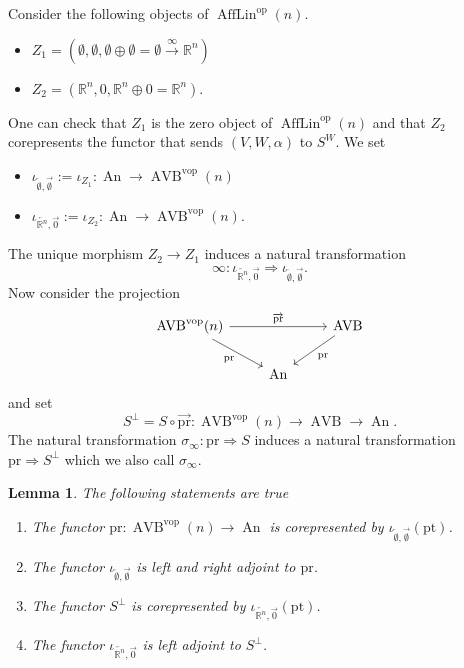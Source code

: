 \documentclass{article}
\newcommand{\xto}{\xrightarrow}
\newcommand{\R}{\mathbb{R}} %
\newcommand{\pt}{\mathrm{pt}}
\newcommand{\op}{\mathrm{op}}
\newcommand{\vop}{\mathrm{vop}}
\newcommand{\pr}{\mathrm{pr}}
\newcommand{\iotaemptyempty}{\iota_{\overleftarrow{\emptyset},\overrightarrow{\emptyset}}}
\newcommand{\iotarnzero}{\iota_{\overleftarrow{\R^n},\overrightarrow{0}}}
\DeclareMathOperator{\AVB}{AVB}
\DeclareMathOperator{\An}{An}
\DeclareMathOperator{\AffLin}{AffLin}
\newtheorem{lemma}{Lemma}
\begin{document}
Consider the following objects of $\AffLin^\op(n)$.
\begin{itemize}
    \item $Z_1 = (\emptyset, \emptyset, \emptyset \oplus \emptyset = \emptyset \xto{\infty} \R^n)$
    \item $Z_2 = (\R^n, 0, \R^n \oplus 0 = \R^n)$.
\end{itemize}
One can check that $Z_1$ is the zero object of $\AffLin^\op(n)$ and that $Z_2$ corepresents the functor 
that sends $(V,W,\alpha)$ to $S^W$.
We set 
\begin{itemize}
    \item $\iota_{\overleftarrow{\emptyset},\overrightarrow{\emptyset}} := \iota_{Z_1} \colon \An \to \AVB^\vop(n)$
    \item $\iota_{\overleftarrow{\R^n},\overrightarrow{0}} := \iota_{Z_2} \colon \An \to \AVB^\vop(n)$.
\end{itemize}
The unique morphism $Z_2 \to Z_1$ induces a natural transformation \[
    \infty \colon \iota_{\overleftarrow{\R^n},\overrightarrow{0}} \Rightarrow 
\iota_{\overleftarrow{\emptyset},\overrightarrow{\emptyset}}.
\]
Now consider the projection 
\[\begin{tikzcd}
	{\AVB^\vop(n)} && \AVB \\
	& \An
	\arrow["{\overrightarrow{\pr}}", from=1-1, to=1-3]
	\arrow["\pr"', from=1-1, to=2-2]
	\arrow["\pr", from=1-3, to=2-2]
\end{tikzcd}\]
and set 
\[
S^\perp = S \circ \overrightarrow{\pr} \colon \AVB^\vop(n) \to \AVB \to \An.  
\]
The natural transformation $\sigma_\infty \colon \pr \Rightarrow S$ induces a 
natural transformation $\pr \Rightarrow S^\perp$ which we also call $\sigma_\infty$.

\begin{lemma}The following statements are true
    \begin{enumerate}
        \item The functor $\pr \colon \AVB^\vop(n) \to \An$ is corepresented by $\iotaemptyempty(\pt)$.
        \item The functor $\iotaemptyempty$ is left and right adjoint to $\pr$.
        \item The functor $S^\perp$ is corepresented by $\iotarnzero(\pt)$.
        \item The functor $\iotarnzero$ is left adjoint to $S^\perp$.
    \end{enumerate}\label{lemma:favouritelemma}
\end{lemma}
\end{document}
